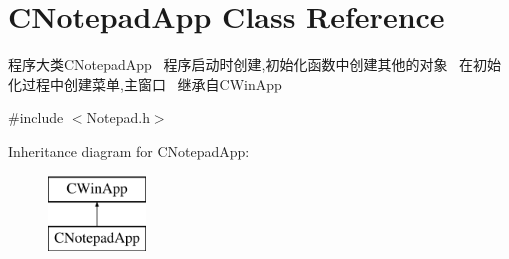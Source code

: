 \hypertarget{class_c_notepad_app}{}\section{C\+Notepad\+App Class Reference}
\label{class_c_notepad_app}


程序大类\+C\+Notepad\+App~\newline
程序启动时创建,初始化函数中创建其他的对象~\newline
在初始化过程中创建菜单,主窗口~\newline
继承自\+C\+Win\+App  




{\ttfamily \#include $<$Notepad.\+h$>$}

Inheritance diagram for C\+Notepad\+App\+:\begin{figure}[H]
\begin{center}
\leavevmode
\includegraphics[height=2.000000cm]{class_c_notepad_app}
\end{center}
\end{figure}
